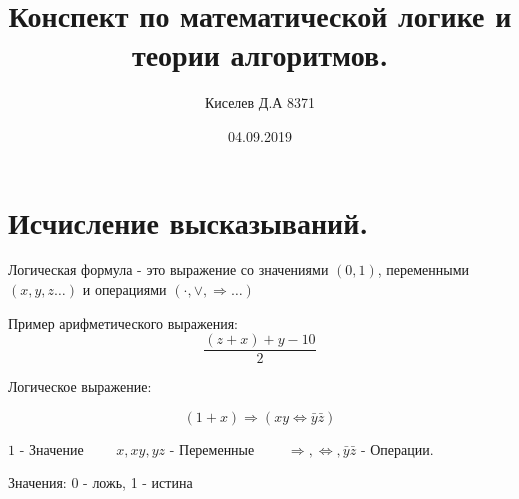 \documentclass[a4paper,12pt]{article}
\author{Киселев Д.А 8371}
\title{Конспект по математической логике и теории алгоритмов.}
\date{04.09.2019}
\begin{document}

    \maketitle


    \section{Исчисление высказываний.}

    Логическая формула - это выражение со значениями $(0,1)$, переменными $(x,y,z\ldots)$ и операциями $(\cdot,\vee,\Longrightarrow\ldots)$

    Пример арифметического выражения:
    $$\frac{(z+x)+y-10}{2}$$

    Логическое выражение:

    $$ (1+x)\Longrightarrow(xy\Longleftrightarrow\bar y \bar z)$$

    \begin{center}
        $1$ - Значение $\hspace{20pt}$ $x,xy,yz$ - Переменные $\hspace{20pt}$ $\Longrightarrow, \Longleftrightarrow,\bar y \bar z $ - Операции.
    \end{center}

    Значения: 0 - ложь, 1 - истина
\end{document}
